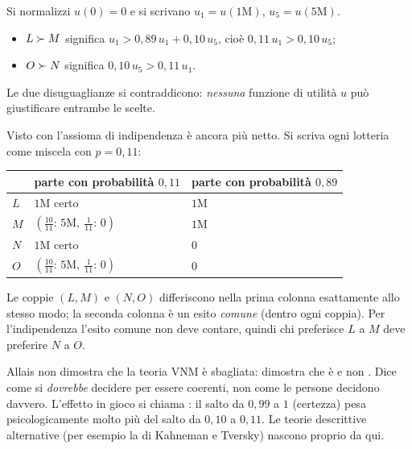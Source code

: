 \begin{extra}
Si normalizzi $u(0) = 0$ e si scrivano $u_1 = u(1\text{M})$, $u_5 = u(5\text{M})$.
\begin{itemize}
  \item $L \succ M$ significa
        $u_1 > 0{,}89\,u_1 + 0{,}10\,u_5$, cioè $0{,}11\,u_1 > 0{,}10\,u_5$;
  \item $O \succ N$ significa
        $0{,}10\,u_5 > 0{,}11\,u_1$.
\end{itemize}
Le due disuguaglianze si contraddicono: \emph{nessuna} funzione di utilità $u$ può
giustificare entrambe le scelte.

Visto con l'assioma di indipendenza è ancora più netto. Si scriva ogni lotteria come
miscela con $p = 0{,}11$:
\begin{center}
\renewcommand{\arraystretch}{1.25}
\begin{tabular}{lll}
\toprule
 & parte con probabilità $0{,}11$ & parte con probabilità $0{,}89$ \\
\midrule
$L$ & $1$M certo                                  & $1$M \\
$M$ & $(\tfrac{10}{11}{:}\,5\text{M},\ \tfrac{1}{11}{:}\,0)$ & $1$M \\[2pt]
$N$ & $1$M certo                                  & $0$ \\
$O$ & $(\tfrac{10}{11}{:}\,5\text{M},\ \tfrac{1}{11}{:}\,0)$ & $0$ \\
\bottomrule
\end{tabular}
\end{center}
Le coppie $(L,M)$ e $(N,O)$ differiscono nella prima colonna esattamente allo stesso modo;
la seconda colonna è un esito \emph{comune} (dentro ogni coppia). Per l'indipendenza
l'esito comune non deve contare, quindi chi preferisce $L$ a $M$ deve preferire $N$ a $O$.
\end{extra}

\begin{osservazione}
Allais non dimostra che la teoria VNM è sbagliata: dimostra che è  e non
. Dice come si \emph{dovrebbe} decidere per essere coerenti, non come le
persone decidono davvero. L'effetto in gioco si chiama : il salto da
$0{,}99$ a $1$ (certezza) pesa psicologicamente molto più del salto da $0{,}10$ a $0{,}11$.
Le teorie descrittive alternative (per esempio la  di Kahneman e
Tversky) nascono proprio da qui.
\end{osservazione}

